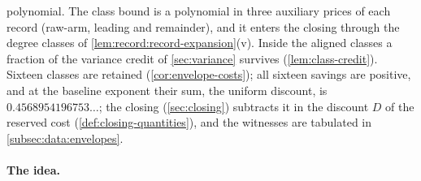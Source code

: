 polynomial. The class bound is a polynomial in three auxiliary prices of each
record (raw-arm, leading and remainder), and it enters the closing through the
degree classes of \cref{lem:record:record-expansion}(v). Inside the aligned
classes a fraction of the variance credit of \cref{sec:variance} survives
(\cref{lem:class-credit}). Sixteen classes are retained (\cref{cor:envelope-costs});
all sixteen savings are positive, and at the baseline exponent their sum, the uniform discount, is
$0.4568954196753\ldots$; the closing (\cref{sec:closing}) subtracts it in the
discount $D$ of the reserved cost (\cref{def:closing-quantities}), and the
witnesses are tabulated in \cref{subsec:data:envelopes}.

\paragraph{The idea.}
